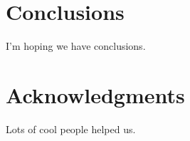 \documentclass{sig-alternate-05-2015}
\begin{document}
\section{Conclusions}
\label{sec:conclusions}

I'm hoping we have conclusions.

\section*{Acknowledgments}
Lots of cool people helped us.


%
%


\end{document}
